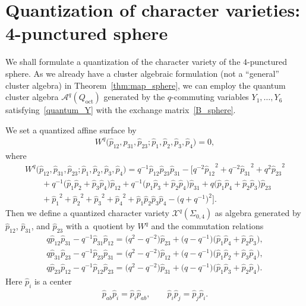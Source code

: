 \documentclass[pdftex]{sigma}
\numberwithin{equation}{section}
\begin{document}
\section{Quantization of character varieties: 4-punctured sphere}\label{sec:q_sphere}

We shall formulate a quantization of the character variety of the $4$-punctured sphere. As we already have a cluster algebraic formulation (not a ``general'' cluster algebra) in Theorem~\ref{thm:map_sphere}, we can employ
the quantum cluster algebra $\mathcal{A}^q(Q_{\text{oct}})$ generated by the $q$-commuting variables $Y_1,\dots,Y_6$ satisfying~\eqref{quantum_Y} with the exchange matrix~\eqref{B_sphere}.

We set a quantized affine surface by
\begin{gather} \label{qW_is_zero}
 W^q \big( \hat{p}_{12}, \hat{p}_{31}, \hat{p}_{23}; \hat{p}_1, \hat{p}_2, \hat{p}_3, \hat{p}_4 \big) = 0,
\end{gather}
where
\begin{gather}
 W^q \big( \hat{p}_{12}, \hat{p}_{31}, \hat{p}_{23}; \hat{p}_1, \hat{p}_2, \hat{p}_3, \hat{p}_4 \big) = q^{-1} \hat{p}_{12} \hat{p}_{23} \hat{p}_{31} - \bigl[ q^{-2} {\hat{p}_{12}}^{2} + q^{-2} {\hat{p}_{31}}^{2}
 + q^2 {\hat{p}_{23}}^{2} \nonumber\\
 \qquad {} +q^{-1} \big( \hat{p}_1 \hat{p}_2 + \hat{p}_3 \hat{p}_4 \big) \hat{p}_{12} +q^{-1} \big( \hat{p}_1 \hat{p}_3 + \hat{p}_2 \hat{p}_4 \big) \hat{p}_{31} +q \big( \hat{p}_1 \hat{p}_4 + \hat{p}_2 \hat{p}_3 \big)
 \hat{p}_{23}\nonumber \\
 \qquad{} + {\hat{p}_1}^{2} + {\hat{p}_2}^{2}+ {\hat{p}_3}^{2} + {\hat{p}_4}^{2} + \hat{p}_1 \hat{p}_2 \hat{p}_3 \hat{p}_4 -\big( q+q^{-1} \big)^2 \bigr]. \label{center_x_b}
\end{gather}
Then we define a quantized character variety $\mathcal{X}^q(\Sigma_{0,4})$ as algebra generated by $\hat{p}_{12}$, $\hat{p}_{31}$, and $\hat{p}_{23}$ with a~quotient by $W^q$ and the commutation relations
\begin{gather}
 q \hat{p}_{12} \hat{p}_{31} - q^{-1} \hat{p}_{31} \hat{p}_{12} = \big(q^2-q^{-2}\big) \hat{p}_{23} + \big(q-q^{-1}\big) \big( \hat{p}_1 \hat{p}_4 + \hat{p}_2 \hat{p}_3 \big) ,\nonumber \\
q \hat{p}_{31} \hat{p}_{23} - q^{-1} \hat{p}_{23} \hat{p}_{31} = \big(q^2-q^{-2}\big) \hat{p}_{12} + \big(q-q^{-1}\big) \big( \hat{p}_1 \hat{p}_2 + \hat{p}_3 \hat{p}_4 \big) ,\nonumber \\
 q \hat{p}_{23} \hat{p}_{12} - q^{-1} \hat{p}_{12} \hat{p}_{23} = \big(q^2-q^{-2}\big) \hat{p}_{31} + \big(q-q^{-1}\big) \big( \hat{p}_1 \hat{p}_3 + \hat{p}_2 \hat{p}_4 \big) .\label{quantum_x_b}
\end{gather}
Here $\hat{p}_i$ is a center
\begin{gather*}
 \hat{p}_{ab} \hat{p}_i = \hat{p}_i \hat{p}_{ab}, \qquad \hat{p}_i \hat{p}_j = \hat{p}_j \hat{p}_i .
\end{gather*}
\end{document}
